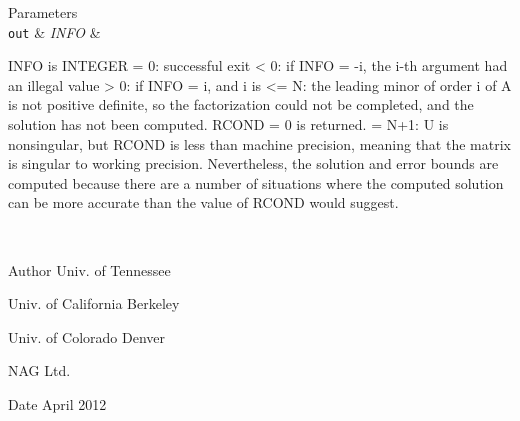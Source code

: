 \begin{DoxyParams}[1]{Parameters}
\\
\hline
\mbox{\tt out}  & {\em I\+N\+F\+O} & \begin{DoxyVerb}          INFO is INTEGER
          = 0: successful exit
          < 0: if INFO = -i, the i-th argument had an illegal value
          > 0: if INFO = i, and i is
                <= N:  the leading minor of order i of A is
                       not positive definite, so the factorization
                       could not be completed, and the solution has not
                       been computed. RCOND = 0 is returned.
                = N+1: U is nonsingular, but RCOND is less than machine
                       precision, meaning that the matrix is singular
                       to working precision.  Nevertheless, the
                       solution and error bounds are computed because
                       there are a number of situations where the
                       computed solution can be more accurate than the
                       value of RCOND would suggest.\end{DoxyVerb}
 \\
\hline
\end{DoxyParams}
\begin{DoxyAuthor}{Author}
Univ. of Tennessee 

Univ. of California Berkeley 

Univ. of Colorado Denver 

N\+A\+G Ltd. 
\end{DoxyAuthor}
\begin{DoxyDate}{Date}
April 2012 
\end{DoxyDate}
\hypertarget{group__complexPOsolve_ga9d8d6eb1ee0b2e2769fa5995714f09b3}{}

